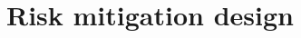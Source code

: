 \documentclass[12pt]{article}
\newcounter{engineering}
\begin{document}
\section{Risk mitigation design}
\end{document}
